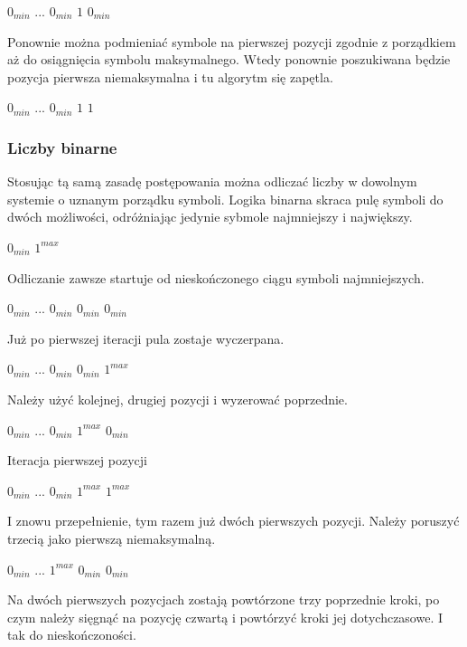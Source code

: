 \documentclass[a4paper,12pt]{article}
\begin{document}
$0_{min}$ ... $0_{min}$ $1$ $0_{min}$

Ponownie można podmieniać symbole na pierwszej pozycji zgodnie z porządkiem aż do osiągnięcia symbolu maksymalnego. Wtedy ponownie poszukiwana będzie pozycja pierwsza niemaksymalna i tu algorytm się zapętla.

$0_{min}$ ... $0_{min}$ $1$ $1$

\subsubsection{Liczby binarne}

Stosując tą samą zasadę postępowania można odliczać liczby w dowolnym systemie o uznanym porządku symboli. Logika binarna skraca pulę symboli do dwóch możliwości, odróżniając jedynie sybmole najmniejszy i największy.

$0_{min}$ $1^{max}$

Odliczanie zawsze startuje od nieskończonego ciągu symboli najmniejszych.

$0_{min}$ ... $0_{min}$ $0_{min}$ $0_{min}$

Już po pierwszej iteracji pula zostaje wyczerpana.

$0_{min}$ ... $0_{min}$ $0_{min}$ $1^{max}$

Należy użyć kolejnej, drugiej pozycji i wyzerować poprzednie.

$0_{min}$ ... $0_{min}$ $1^{max}$ $0_{min}$

Iteracja pierwszej pozycji

$0_{min}$ ... $0_{min}$ $1^{max}$ $1^{max}$

I znowu przepełnienie, tym razem już dwóch pierwszych pozycji. Należy poruszyć trzecią jako pierwszą niemaksymalną.

$0_{min}$ ... $1^{max}$ $0_{min}$ $0_{min}$

Na dwóch pierwszych pozycjach zostają powtórzone trzy poprzednie kroki, po czym należy sięgnąć na pozycję czwartą i powtórzyć kroki jej dotychczasowe. I tak do nieskończoności.
\end{document}
